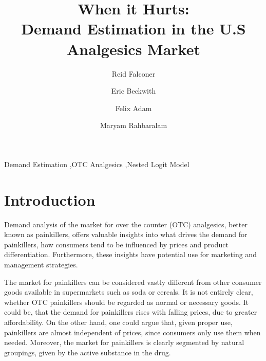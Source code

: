 \documentclass[12pt, authoryear]{elsarticle}
\begin{document}
\begin{frontmatter}  %

\title{When it Hurts: \\ \vspace{0.5cm} \large Demand Estimation in the U.S Analgesics Market}

\author[Add1]{Reid Falconer}

\author[Add1]{Eric Beckwith}

\author[Add1]{Felix Adam}
\author[Add1]{Maryam Rahbaralam}

\address[Add1]{Barcelona Graduate School of Economics, Barcelona, Spain}




\begin{keyword}
\footnotesize{
Demand Estimation  \sep OTC Analgesics \sep  Nested Logit Model \\ \vspace{0.3cm}
}
\end{keyword}
\vspace{0.5cm}
\end{frontmatter}

\headsep 35pt %


\section{Introduction} \label{introduction}
Demand analysis of the market for over the counter (OTC) analgesics, better known as painkillers, offers valuable insights into what drives the demand for painkillers, how consumers tend to be influenced by prices and product differentiation. Furthermore, these insights have potential use for marketing and management strategies.

The market for painkillers can be considered vastly different from other consumer goods available in supermarkets such as soda or cereals. It is not entirely clear, whether OTC painkillers should be regarded as normal or necessary goods. It could be, that the demand for painkillers rises with falling prices, due to greater affordability. On the other hand, one could argue that, given proper use, painkillers are almost independent of prices, since consumers only use them when needed. Moreover, the market for painkillers is clearly segmented by natural groupings, given by the active substance in the drug.
\end{document}
